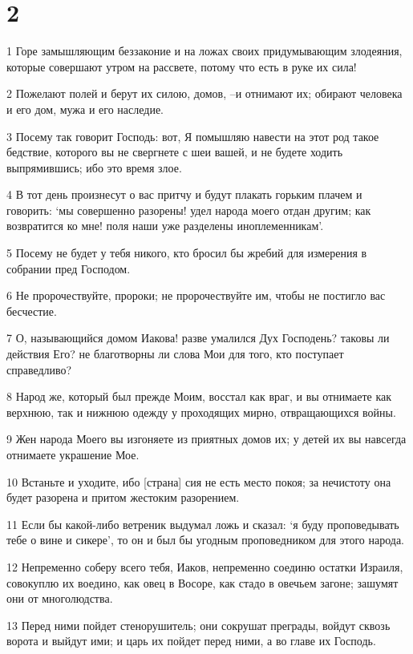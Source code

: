 \chapter{2}

\par 1 Горе замышляющим беззаконие и на ложах своих придумывающим злодеяния, которые совершают утром на рассвете, потому что есть в руке их сила!
\par 2 Пожелают полей и берут их силою, домов, --и отнимают их; обирают человека и его дом, мужа и его наследие.
\par 3 Посему так говорит Господь: вот, Я помышляю навести на этот род такое бедствие, которого вы не свергнете с шеи вашей, и не будете ходить выпрямившись; ибо это время злое.
\par 4 В тот день произнесут о вас притчу и будут плакать горьким плачем и говорить: `мы совершенно разорены! удел народа моего отдан другим; как возвратится ко мне! поля наши уже разделены иноплеменникам'.
\par 5 Посему не будет у тебя никого, кто бросил бы жребий для измерения в собрании пред Господом.
\par 6 Не пророчествуйте, пророки; не пророчествуйте им, чтобы не постигло вас бесчестие.
\par 7 О, называющийся домом Иакова! разве умалился Дух Господень? таковы ли действия Его? не благотворны ли слова Мои для того, кто поступает справедливо?
\par 8 Народ же, который был прежде Моим, восстал как враг, и вы отнимаете как верхнюю, так и нижнюю одежду у проходящих мирно, отвращающихся войны.
\par 9 Жен народа Моего вы изгоняете из приятных домов их; у детей их вы навсегда отнимаете украшение Мое.
\par 10 Встаньте и уходите, ибо [страна] сия не есть место покоя; за нечистоту она будет разорена и притом жестоким разорением.
\par 11 Если бы какой-либо ветреник выдумал ложь и сказал: `я буду проповедывать тебе о вине и сикере', то он и был бы угодным проповедником для этого народа.
\par 12 Непременно соберу всего тебя, Иаков, непременно соединю остатки Израиля, совокуплю их воедино, как овец в Восоре, как стадо в овечьем загоне; зашумят они от многолюдства.
\par 13 Перед ними пойдет стенорушитель; они сокрушат преграды, войдут сквозь ворота и выйдут ими; и царь их пойдет перед ними, а во главе их Господь.

